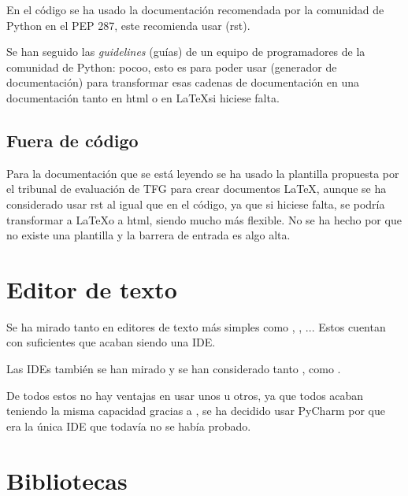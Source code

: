 En el código se ha usado la documentación recomendada por la comunidad de Python en el PEP 287\cite{pep287}, este recomienda usar  (rst).

Se han seguido las \emph{guidelines} (guías) de un equipo de programadores de la comunidad de Python: pocoo\cite{pocoo}, esto es para poder usar  (generador de documentación) para transformar esas cadenas de documentación en una documentación tanto en html o en \LaTeX  si hiciese falta.

\subsection{Fuera de código}

Para la documentación que se está leyendo se ha usado la plantilla propuesta por el tribunal de evaluación de TFG para crear documentos \LaTeX , aunque se ha considerado usar rst al igual que en el código, ya que si hiciese falta, se podría transformar a \LaTeX o a html, siendo mucho más flexible. No se ha hecho por que no existe una plantilla y la barrera de entrada es algo alta.


\section{Editor de texto}

Se ha mirado tanto en editores de texto más simples como , , ... Estos cuentan con suficientes  que acaban siendo una IDE.

Las IDEs también se han mirado y se han considerado tanto ,  como .

De todos estos no hay ventajas en usar unos u otros, ya que todos acaban teniendo la misma capacidad gracias a , se ha decidido usar PyCharm por que era la única IDE que todavía no se había probado.


\section{Bibliotecas}

